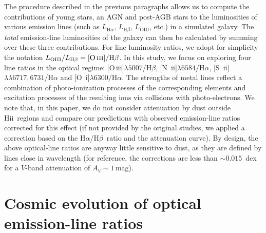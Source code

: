 \documentclass[fleqn,usenatbib]{mnras}
\newcommand{\hii}{\hbox{H{\sc ii}}}
\newcommand{\ha}{\hbox{H$\alpha$}}
\newcommand{\hb}{\hbox{H$\beta$}}
\newcommand{\oiiihb}{\hbox{[O\,{\sc iii}]/H$\beta$}}
\begin{document}
The procedure described in the previous paragraphs allows us to
compute the contributions of young stars, an AGN and post-AGB stars to
the luminosities of various emission lines (such as
$L_{\mathrm{H}\alpha}$, $L_{\mathrm{H}\beta}$,  $L_{\mathrm{OIII}}$,
etc.) in a simulated galaxy. The {\it total} emission-line
luminosities of the galaxy can then be calculated by summing over
these three contributions. For line luminosity ratios, we adopt for
simplicity the notation
$L_{\mathrm{OIII}}/L_{\mathrm{H}\beta}=\oiiihb$. In this study, we
focus on exploring four line ratios in the optical regime: 
[O\,{\sc iii}]$\lambda5007$/H$\beta$, [N\,{\sc
  ii}]$\lambda6584$/H$\alpha$,  [S\,{\sc
  ii}]$\lambda\lambda6717,6731$/H$\alpha$ and [O\,{\sc
  i}]$\lambda6300$/H$\alpha$. The strengths of metal lines reflect  
a combination of photo-ionization processes of the corresponding
elements  and excitation processes of the resulting ions via
collisions with photo-electrons.  We note that, in this paper, we 
do not consider attenuation by dust outside \hii\ regions
and compare our predictions with observed emission-line ratios
corrected for this effect (if not provided by the original studies, we 
applied a correction based on the \ha/\hb\ ratio and the \citealt{Calzetti00} 
attenuation curve). By design, 
the above optical-line ratios are anyway little sensitive to dust, as
they are defined by lines close in wavelength (for reference, the 
corrections are less than $\sim0.015$~dex for a $V$-band attenuation 
of $A_V\sim1$\,mag).     
 
\section{Cosmic evolution of optical emission-line ratios}\label{cosmicevolution} 
\end{document}
